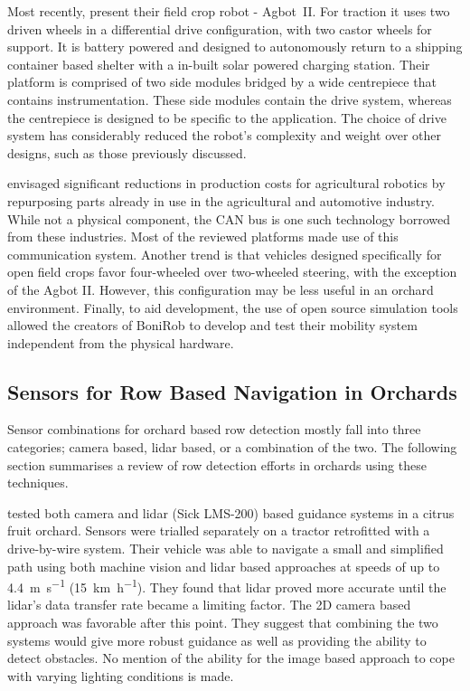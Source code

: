 \documentclass[preprint,authoryear,12pt]{elsarticle}
\begin{document}
        Most recently, \cite{Bawden2017} present their field crop robot - Agbot~II.
        For traction it uses two driven wheels in a differential drive configuration, with two castor wheels for support.
        It is battery powered and designed to autonomously return to a shipping container based shelter with a in-built solar powered charging station.
        Their platform is comprised of two side modules bridged by a wide centrepiece that contains instrumentation.
        These side modules contain the drive system, whereas the centrepiece is designed to be specific to the application.
        The choice of drive system has considerably reduced the robot's complexity and weight over other designs, such as those previously discussed.

        \cite{Blackmore2007} envisaged significant reductions in production costs for agricultural robotics by repurposing parts already in use in the agricultural and automotive industry.
        While not a physical component, the CAN bus is one such technology borrowed from these industries.
        Most of the reviewed platforms made use of this communication system.
        Another trend is that vehicles designed specifically for open field crops favor four-wheeled over two-wheeled steering, with the exception of the Agbot II.
        However, this configuration may be less useful in an orchard environment.
        Finally, to aid development, the use of open source simulation tools allowed the creators of BoniRob to develop and test their mobility system independent from the physical hardware.


    \subsection{Sensors for Row Based Navigation in Orchards}

        Sensor combinations for orchard based row detection mostly fall into three categories; camera based, lidar based, or a combination of the two.
        The following section summarises a review of row detection efforts in orchards using these techniques.

        \cite{Subramanian2006} tested both camera and lidar (Sick LMS-200) based guidance systems in a citrus fruit orchard.
        Sensors were trialled separately on a tractor retrofitted with a drive-by-wire system.
        Their vehicle was able to navigate a small and simplified path using both machine vision and lidar based approaches at speeds of up to \SI{4.4}{\meter\per\second} (\SI{15}{\kilo\meter\per\hour}).
        They found that lidar proved more accurate until the lidar's data transfer rate became a limiting factor.
        The 2D camera based approach was favorable after this point.
        They suggest that combining the two systems would give more robust guidance as well as providing the ability to detect obstacles.
        No mention of the ability for the image based approach to cope with varying lighting conditions is made.
\end{document}
